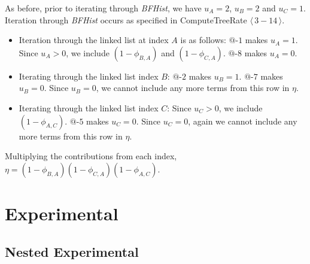 \documentclass[12pt]{article}
\newcommand{\changed}[1]{#1}
\newcommand{\changed}[1]{\textcolor{red}{#1}}
\newcommand{\varName}[1]{\textrm{\it#1}}
\newcommand{\citeBlock}[2]{$\langle \, #1 - #2 \, \rangle$}
\newcommand{\nodeLabel}[2]{\mbox{$#1$-$#2$}}
\begin{document}
\changed{As before, prior to iterating through \varName{BFHist}, we have $u_A = 2$, $u_B = 2$ and $u_C = 1$. Iteration through \varName{BFHist} occurs as specified in ComputeTreeRate \citeBlock{3}{14}.}

\changed{\begin{itemize}
\item Iteration through the linked list at index $A$ is as follows: \nodeLabel{@}{1} makes $u_{A} = 1$. Since $u_{A} > 0$, we include $(1 - \phi_{B, A})$ and $(1 - \phi_{C, A})$. \nodeLabel{@}{8} makes $u_{A} = 0$.
\item Iterating through the linked list index $B$: \nodeLabel{@}{2} makes $u_{B} = 1$. \nodeLabel{@}{7} makes $u_{B} = 0$. Since $u_{B} = 0$, we cannot include any more terms from this row in $\eta$. 
\item Iterating through the linked list index $C$: Since $u_{C} > 0$, we include $(1 - \phi_{A, C})$. \nodeLabel{@}{5} makes $u_{C} = 0$. Since $u_{C} = 0$, again we cannot include any more terms from this row in $\eta$. 
\end{itemize}
Multiplying the contributions from each index, $\eta = (1 - \phi_{B, A}) (1 - \phi_{C, A}) (1 - \phi_{A, C})$.}
 
\section{Experimental}
\subsection{Nested Experimental}



\end{document}
